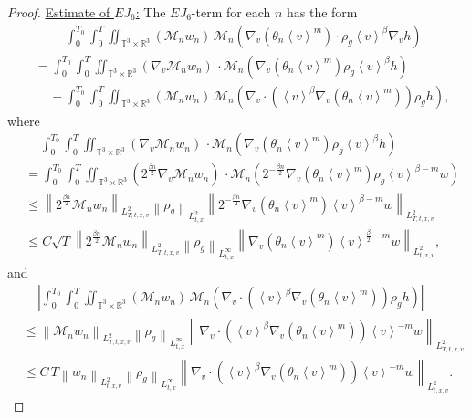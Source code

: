 \documentclass[11pt,american, reqno]{amsart}
\numberwithin{equation}{section}
\newcommand{\R}{\mathbb R}
\newcommand{\1}{\mathds{1}}
\newcommand{\Ni}{\noindent}
\newcommand{\CalM}{\mathcal{M}}
\newcommand{\vpran}[1]{\left(#1\right)}
\newcommand{\norm}[1]{\left\lVert#1\right\rVert}
\newcommand{\abs}[1]{\left\vert#1\right\vert}
\newcommand{\vint}[1]{\left\langle#1\right\rangle}
\newcommand{\T}{\mathbb{T}}
\numberwithin{equation}{section}
\begin{document}
\begin{proof}
\Ni \underline{Estimate of $EJ_6$:} The $EJ_6$-term for each $n$ has the form
\begin{align*}
& \quad \,
 - \int_0^{T_0} \int_0^T \iint_{\T^3 \times \R^3}
   \vpran{\CalM_n w_n} \,
   \CalM_n \vpran{\nabla_v\vpran{\theta_n \vint{v}^m}    \cdot \rho_g \vint{v}^\beta
   \nabla_v h}
\\
& = \int_0^{T_0} \int_0^T \iint_{\T^3 \times \R^3}
   \vpran{\nabla_v \CalM_n w_n} \, \cdot
   \CalM_n \vpran{\nabla_v\vpran{\theta_n \vint{v}^m} \rho_g \vint{v}^\beta
   h}
\\
& \quad \,
 - \int_0^{T_0} \int_0^T \iint_{\T^3 \times \R^3}
   \vpran{\CalM_n w_n} \,
   \CalM_n \vpran{\nabla_v \cdot \vpran{\vint{v}^\beta \nabla_v\vpran{\theta_n \vint{v}^m}}    
   \rho_g h},
\end{align*}
where
\begin{align*}
& \quad \,
\int_0^{T_0} \int_0^T \iint_{\T^3 \times \R^3}
   \vpran{\nabla_v \CalM_n w_n} \, \cdot
   \CalM_n \vpran{\nabla_v\vpran{\theta_n \vint{v}^m} \rho_g \vint{v}^{\beta}
   h}
\\
& = \int_0^{T_0} \int_0^T \iint_{\T^3 \times \R^3}
   \vpran{2^{\frac{\beta n}{2}}\nabla_v \CalM_n w_n} \, \cdot
   \CalM_n \vpran{2^{-\frac{\beta n}{2}}\nabla_v\vpran{\theta_n \vint{v}^m} \rho_g \vint{v}^{\beta-m}
   w}
\\
& \leq 
 \norm{2^{\frac{\beta n}{2}}\CalM_n w_n}_{L^2_{T,t,x,v}}
 \norm{\rho_g}_{L^2_{t,x}}
 \norm{2^{-\frac{\beta n}{2}}\nabla_v\vpran{\theta_n \vint{v}^m} \vint{v}^{\beta-m}
   w}_{L^2_{T,t,x,v}}
\\
& \leq 
 C \sqrt{T}
 \norm{2^{\frac{\beta n}{2}}\CalM_n w_n}_{L^2_{T,t,x,v}}
 \norm{\rho_g}_{L^\infty_{t,x}}
 \norm{\nabla_v\vpran{\theta_n \vint{v}^m} \vint{v}^{\frac{\beta}{2}-m}
   w}_{L^2_{t,x,v}} ,
\end{align*}
and
\begin{align*}
& \quad \,
\abs{\int_0^{T_0} \int_0^T \iint_{\T^3 \times \R^3}
   \vpran{\CalM_n w_n} \,
   \CalM_n \vpran{\nabla_v \cdot \vpran{\vint{v}^\beta \nabla_v\vpran{\theta_n \vint{v}^m}}    
   \rho_g h}}
\\
& \leq
\norm{\CalM_n w_n}_{L^2_{T,t,x,v}}
\norm{\rho_g}_{L^\infty_{t,x}}
\norm{\nabla_v \cdot \vpran{\vint{v}^\beta \nabla_v\vpran{\theta_n \vint{v}^m}} \vint{v}^{-m} w}_{L^2_{T,t,x,v}}
\\
& \leq
 C \, T
 \norm{w_n}_{L^2_{t,x,v}}
\norm{\rho_g}_{L^\infty_{t,x}}
\norm{\nabla_v \cdot \vpran{\vint{v}^\beta \nabla_v\vpran{\theta_n \vint{v}^m}} \vint{v}^{-m} w}_{L^2_{t,x,v}}.
\end{align*}

\end{proof}
\end{document}
